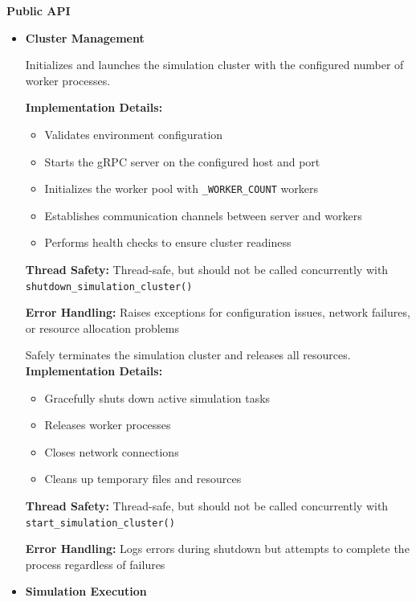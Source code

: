 \textbf{Public API}
\begin{itemize}
	\item \textbf{Cluster Management}


	 Initializes and launches the simulation cluster with the configured number of worker processes.

	 \textbf{Implementation Details:}
	 \begin{itemize}
	 	\item Validates environment configuration
	 	\item Starts the gRPC server on the configured host and port
	 	\item Initializes the worker pool with \texttt{\_WORKER\_COUNT} workers
	 	\item Establishes communication channels between server and workers
	 	\item Performs health checks to ensure cluster readiness
	 \end{itemize}

	 \textbf{Thread Safety:} Thread-safe, but should not be called concurrently with \texttt{shutdown\_simulation\_cluster()}

	 \textbf{Error Handling:} Raises exceptions for configuration issues, network failures, or resource allocation problems


	Safely terminates the simulation cluster and releases all resources.
	\textbf{Implementation Details:}
	\begin{itemize}
		\item Gracefully shuts down active simulation tasks
		\item Releases worker processes
		\item Closes network connections
		\item Cleans up temporary files and resources
	\end{itemize}

	\textbf{Thread Safety:} Thread-safe, but should not be called concurrently with \texttt{start\_simulation\_cluster()}

	\textbf{Error Handling:} Logs errors during shutdown but attempts to complete the process regardless of failures

	\item \textbf{Simulation Execution}


\end{itemize}
